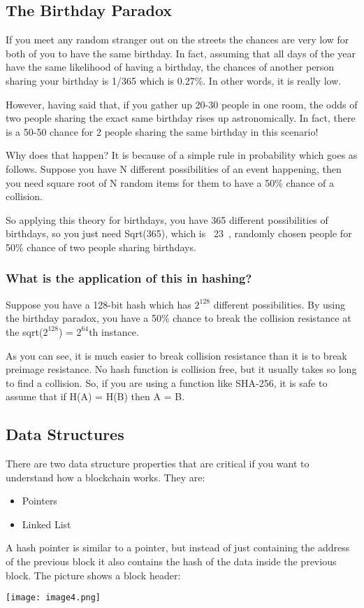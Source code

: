 \documentclass{article}
\begin{document}
\subsection{The Birthday Paradox}
If you meet any random stranger out on the streets the chances are very low for both of you to have the same birthday. In fact, assuming that all days of the year have the same likelihood of having a birthday, the chances of another person sharing your birthday is 1/365 which is 0.27\%. In other words, it is really low.
\par
However, having said that, if you gather up 20-30 people in one room, the odds of two people sharing the exact same birthday rises up astronomically. In fact, there is a 50-50 chance for 2 people sharing the same birthday in this scenario!
\par Why does that happen? It is because of a simple rule in probability which goes as follows. Suppose you have N different possibilities of an event happening, then you need square root of N random items for them to have a 50\% chance of a collision. \par
So applying this theory for birthdays, you have 365 different possibilities of birthdays, so you just need Sqrt(365), which is ~23~, randomly chosen people for 50\% chance of two people sharing birthdays.
\subsubsection{What is the application of this in hashing?}
Suppose you have a 128-bit hash which has $2^{128}$ different possibilities. By using the birthday paradox, you have a 50\% chance to break the collision resistance at the sqrt($2^{128}$) = $2^{64}$th instance. \par
As you can see, it is much easier to break collision resistance than it is to break preimage resistance.  No hash function is collision free, but it usually takes so long to find a collision. So, if you are using a function like SHA-256, it is safe to assume that if H(A) = H(B) then A = B. \par

\subsection{Data Structures}
There are two data structure properties that are critical if you want to understand how a blockchain works. They are: 
\begin{itemize}
    \item Pointers
    \item Linked List
\end{itemize}
A hash pointer is similar to a pointer, but instead of just containing the address of the previous block it also contains the hash of the data inside the previous block. The picture shows a block header:
\begin{center}
    \texttt{[image: image4.png]}
\end{center}
\end{document}
